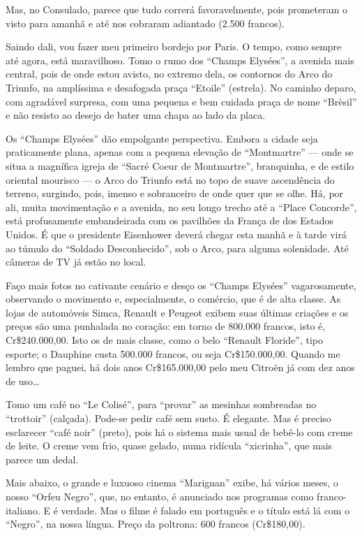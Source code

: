 Mas, no Consulado, parece que tudo correrá favoravelmente, pois prometeram o visto para amanhã e até nos cobraram adiantado (2.500 francos).

Saindo dali, vou fazer meu primeiro bordejo por Paris. O tempo, como sempre até agora, está maravilhoso. Tomo o rumo dos ``Champs Elysées'', a avenida mais central, pois de onde estou avisto, no extremo dela, os contornos do Arco do Triunfo, na amplíssima e desafogada praça ``Etoile'' (estrela). No caminho deparo, com agradável surpresa, com uma pequena e bem cuidada praça de nome ``Brèsil'' e não resisto ao desejo de bater uma chapa ao lado da placa.

Os ``Champs Elysées'' dão empolgante perspectiva. Embora a cidade seja praticamente plana, apenas com a pequena elevação de ``Montmartre'' --- onde se situa a magnífica igreja de ``Sacré Coeur de Montmartre'', branquinha, e de estilo oriental mourisco --- o Arco do Triunfo está no topo de suave ascendência do terreno, surgindo, pois, imenso e sobranceiro de onde quer que se olhe. Há, por ali, muita movimentação e a avenida, no seu longo trecho até a ``Place Concorde'', está profusamente embandeirada com os pavilhões da França de dos Estados Unidos. É que o presidente Eisenhower deverá chegar esta manhã e à tarde virá ao túmulo do ``Soldado Desconhecido'', sob o Arco, para alguma solenidade. Até câmeras de TV já estão no local.

Faço mais fotos no cativante cenário e desço os ``Champs Elysées'' vagarosamente, observando o movimento e, especialmente, o comércio, que é de alta classe. As lojas de automóveis Simca, Renault e Peugeot exibem suas últimas criações e os preços são uma punhalada no coração: em torno de 800.000 francos, isto é, Cr\$240.000,00. Isto os de mais classe, como o belo ``Renault Floride'', tipo esporte; o Dauphine custa 500.000 francos, ou seja Cr\$150.000,00. Quando me lembro que paguei, há dois anos Cr\$165.000,00 pelo meu Citroën já com dez anos de uso\ldots

Tomo um café no ``Le Colisé'', para ``provar'' as mesinhas sombreadas no ``trottoir'' (calçada). Pode-se pedir café sem susto. É elegante. Mas é preciso esclarecer ``café noir'' (preto), pois há o sistema mais usual de bebê-lo com creme de leite. O creme vem frio, quase gelado, numa ridícula ``xicrinha'', que mais parece um dedal.

Mais abaixo, o grande e luxuoso cinema ``Marignan'' exibe, há vários meses, o nosso ``Orfeu Negro'', que, no entanto, é anunciado nos programas como franco-italiano. E é verdade. Mas o filme é falado em português e o título está lá com o ``Negro'', na nossa língua. Preço da poltrona: 600 francos (Cr\$180,00).

